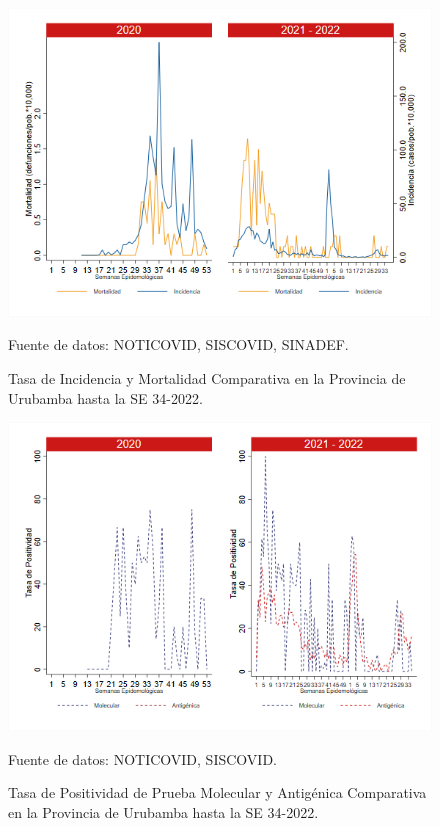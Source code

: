 \documentclass[12pt,a4paper,openany]{book}
\begin{document}
	\begin{figure}[h]
		\caption{Tasa de Incidencia y Mortalidad Comparativa en la Provincia de Urubamba hasta la SE 34-2022.}\label{fig:inc_urub}
		\begin{center}
			\includegraphics[width=0.85\linewidth]{../figuras/incidencia_mortalidad_20_21_13.png}
		\end{center}
		{\footnotesize {Fuente de datos: NOTICOVID, SISCOVID, SINADEF.}}
	\end{figure}
	
	\begin{figure}[h]
		\caption{Tasa de Positividad de Prueba Molecular y Antigénica Comparativa en la Provincia de Urubamba hasta la SE 34-2022.}\label{fig:positividad_urub}
		\begin{center}
			\includegraphics[width=0.7\linewidth]{../figuras/positividad_20_21_13.png}
		\end{center}
		{\footnotesize {Fuente de datos: NOTICOVID, SISCOVID.}}
	\end{figure}
	
\end{document}
